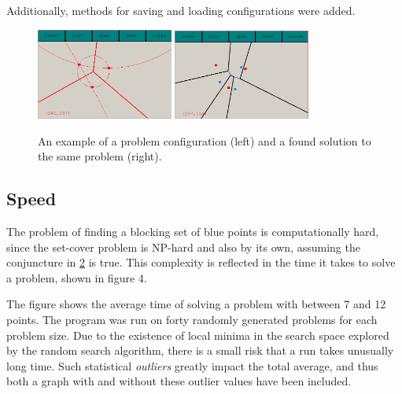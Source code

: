 \documentclass[a4paper,12pt]{article}
\begin{document}
Additionally, methods for saving and loading configurations were added.

\begin{figure}[h]
\includegraphics[width=0.4\textwidth]{pictures/gui.png}
\includegraphics[width=0.4\textwidth]{pictures/guisolved.png}
 \caption[Close up of \textit{Hemidactylus} sp.]
   {An example of a problem configuration (left) and a found solution to the same problem (right).}
\end{figure}

\subsection{Speed}
The problem of finding a blocking set of blue points is computationally hard, since the set-cover problem is NP-hard and also by its own, assuming the conjuncture in \hyperref[ref:blocking]{2} is true. This complexity is reflected in the time it takes to solve a problem, shown in figure 4.

The figure shows the average time of solving a problem with between 7 and 12 points. The program was run on forty randomly generated problems for each problem size. Due to the existence of local minima in the search space explored by the random search algorithm, there is a small risk that a run takes unusually long time. Such statistical \emph{outliers} greatly impact the total average, and thus both a graph with and without these outlier values have been included.
\end{document}
